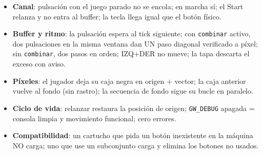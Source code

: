 \begin{itemize}
	\item \textbf{Canal}: pulsación con el juego parado no se encola; en marcha sí; el
	Start relanza y no entra al buffer; la tecla llega igual que el botón
	físico.
	\item \textbf{Buffer y ritmo}: la pulsación espera al tick siguiente; con
	\texttt{combinar} activo, dos pulsaciones en la misma ventana dan UN paso diagonal
	verificado a píxel; sin \texttt{combinar}, dos pasos en orden; IZQ+DER no mueve; la
	tapa descarta el exceso con aviso.
	\item \textbf{Píxeles}: el jugador deja su caja negra en origen $+$ vector; la caja
	anterior vuelve al fondo (sin rastro); la secuencia de fondo sigue su bucle en
	paralelo.
	\item \textbf{Ciclo de vida}: relanzar restaura la posición de origen;
	\texttt{GW\_DEBUG} apagada = consola limpia y movimiento funcional; cero errores.
	\item \textbf{Compatibilidad}: un cartucho que pida un botón inexistente en la
	máquina NO carga; uno que use un subconjunto carga y elimina los botones no usados.
\end{itemize}

